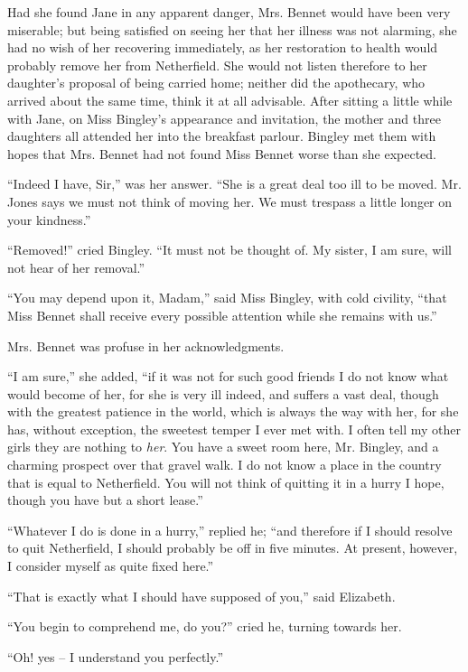 Had she found Jane in any apparent danger, Mrs.
Bennet would have been very miserable; but being
satisfied on seeing her that her illness was not alarming,
she had no wish of her recovering immediately, as her
restoration to health would probably remove her from
Netherfield. She would not listen therefore to her
daughter’s proposal of being carried home; neither did
the apothecary, who arrived about the same time, think
it at all advisable. After sitting a little while with Jane,
on Miss Bingley’s appearance and invitation, the mother
and three daughters all attended her into the breakfast
parlour. Bingley met them with hopes that Mrs. Bennet
had not found Miss Bennet worse than she expected.

“Indeed I have, Sir,” was her answer. “She is a great
deal too ill to be moved. Mr. Jones says we must not
think of moving her. We must trespass a little longer
on your kindness.”

“Removed!” cried Bingley. “It must not be
th\-ought of. My sister, I am sure, will not hear of her
removal.”

“You may depend upon it, Madam,” said Miss Bingley,
with cold civility, “that Miss Bennet shall receive every
possible attention while she remains with us.”

Mrs. Bennet was profuse in her acknowledgments.

“I am sure,” she added, “if it was not for such good
friends I do not know what would become of her, for she
is very ill indeed, and suffers a vast deal, though with the
greatest patience in the world, which is always the way with
her, for she has, without exception, the sweetest temper I
ever met with. I often tell my other girls they are nothing
to \textit{her}. You have a sweet room here, Mr. Bingley, and a
charming prospect over that gravel walk. I do not know
a place in the country that is equal to Netherfield. You
will not think of quitting it in a hurry I hope, though
you have but a short lease.”

“Whatever I do is done in a hurry,” replied he; “and
therefore if I should resolve to quit Netherfield, I should
probably be off in five minutes. At present, however,
I consider myself as quite fixed here.”

“That is exactly what I should have supposed of you,”
said Elizabeth.

“You begin to comprehend me, do you?” cried he,
turning towards her.

“Oh! yes -- I understand you perfectly.”

